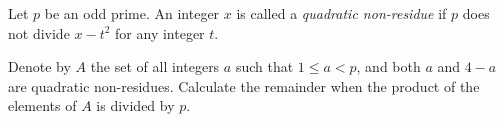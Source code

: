 Let $p$ be an odd prime. An integer $x$ is called a \emph{quadratic non-residue} if $p$ does not divide $x-t^2$ for any integer $t$.

Denote by $A$ the set of all integers $a$ such that $1\leq a<p$, and both $a$ and $4-a$ are quadratic non-residues. Calculate the remainder when the product of the elements of $A$ is divided by $p$.
